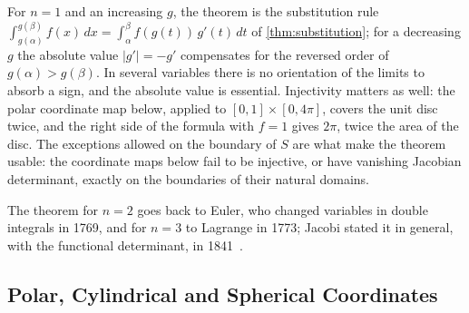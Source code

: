 For $n=1$ and an increasing $g$, the theorem is the substitution rule $\int_{g(\alpha)}^{g(\beta)}f(x)\,dx=\int_\alpha^\beta f(g(t))\,g'(t)\,dt$ of \cref{thm:substitution}; for a decreasing $g$ the absolute value $|g'|=-g'$ compensates for the reversed order of $g(\alpha)>g(\beta)$. In several variables there is no orientation of the limits to absorb a sign, and the absolute value is essential. Injectivity matters as well: the polar coordinate map below, applied to $[0,1]\times[0,4\pi]$, covers the unit disc twice, and the right side of the formula with $f=1$ gives $2\pi$, twice the area of the disc. The exceptions allowed on the boundary of $S$ are what make the theorem usable: the coordinate maps below fail to be injective, or have vanishing Jacobian determinant, exactly on the boundaries of their natural domains.

The theorem for $n=2$ goes back to Euler, who changed variables in double integrals in 1769, and for $n=3$ to Lagrange in 1773; Jacobi stated it in general, with the functional determinant, in 1841~\cite{jacobi1841,katz1982}.

\subsection{Polar, Cylindrical and Spherical Coordinates}


